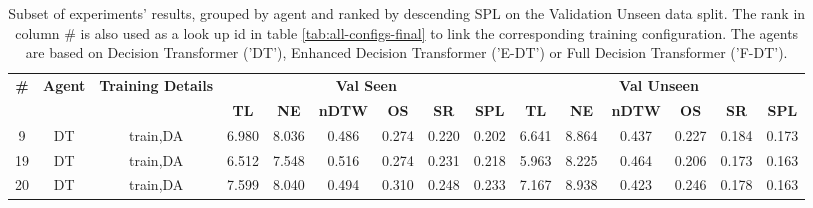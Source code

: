 \begin{table}
\centering
\caption{\label{tab:dagger_pe_oa}Subset of experiments' results, grouped by agent and ranked by descending SPL on the Validation Unseen data split. The rank in column \# is also used as a look up id in table \ref{tab:all-configs-final} to link the corresponding training configuration.     \newline The agents are based on Decision Transformer ('DT'), Enhanced Decision Transformer ('E-DT') or Full Decision Transformer ('F-DT').}
\begin{tabular}{@{\hskip3pt}c@{\hskip3pt}c@{\hskip3pt}c@{\hskip3pt}c@{\hskip3pt}c@{\hskip3pt}c@{\hskip3pt}c@{\hskip3pt}c@{\hskip3pt}c@{\hskip3pt}c@{\hskip3pt}c@{\hskip3pt}c@{\hskip3pt}c@{\hskip3pt}c@{\hskip3pt}c}
\toprule
\textbf{\#} & \textbf{Agent} & \textbf{Training Details} & \multicolumn{6}{c}{\textbf{Val Seen}} & \multicolumn{6}{c}{\textbf{Val Unseen}} \\
\cmidrule(l){4-9} \cmidrule(l){10-15} \textbf{~} &     \textbf{~} &                \textbf{~} &       \textbf{TL} & \textbf{NE} & \textbf{nDTW} & \textbf{OS} & \textbf{SR} & \textbf{SPL} &         \textbf{TL} & \textbf{NE} & \textbf{nDTW} & \textbf{OS} & \textbf{SR} & \textbf{SPL} \\
\midrule
          9 &             DT &                  train,DA &             6.980 &       8.036 &         0.486 &       0.274 &       0.220 &        0.202 &               6.641 &       8.864 &         0.437 &       0.227 &       0.184 &        0.173 \\
         19 &             DT &                  train,DA &             6.512 &       7.548 &         0.516 &       0.274 &       0.231 &        0.218 &               5.963 &       8.225 &         0.464 &       0.206 &       0.173 &        0.163 \\
         20 &             DT &                  train,DA &             7.599 &       8.040 &         0.494 &       0.310 &       0.248 &        0.233 &               7.167 &       8.938 &         0.423 &       0.246 &       0.178 &        0.163 \\
\bottomrule
\end{tabular}
\end{table}

